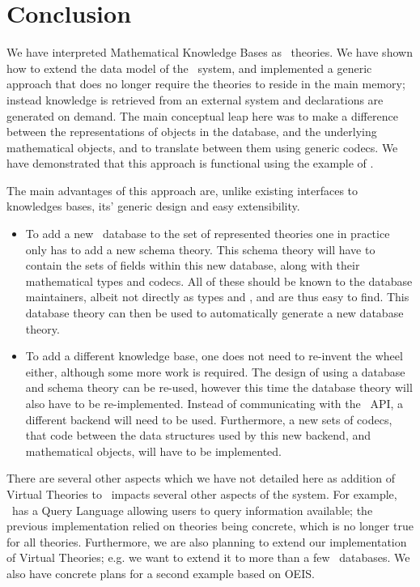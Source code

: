 \section{Conclusion}\label{sec:concl}

We have interpreted Mathematical Knowledge Bases as \omdocmmt\ theories. 
We have shown how to extend the data model of the \mmt\ system, and implemented a generic approach that does no longer require the theories to reside in the main memory; instead knowledge is retrieved from an external system and declarations are generated on demand.
The main conceptual leap here was to make a difference between the representations of objects in the database, and the underlying mathematical objects, and to translate between them using generic codecs. 
We have demonstrated that this approach is functional using the example of \lmfdb. 

The main advantages of this approach are, unlike existing interfaces to knowledges bases, its' generic design and easy extensibility. 
\begin{itemize}
  \item
    To add a new \lmfdb\ database to the set of represented theories one in practice only has to add a new schema theory. 
    This schema theory will have to contain the sets of fields within this new database, along with their mathematical types and codecs. 
    All of these should be known to the database maintainers, albeit not directly as types and , and are thus easy to find. 
    This database theory can then be used to automatically generate a new database theory. 
  \item
    To add a different knowledge base, one does not need to re-invent the wheel either, although some more work is required. 
    The design of using a database and schema theory can be re-used, however this time the database theory will also have to be re-implemented. 
    Instead of communicating with the \lmfdb\ API, a different backend will need to be used. 
    Furthermore, a new sets of codecs, that code between the data structures used by this new backend, and mathematical objects, will have to be implemented. 
\end{itemize}

There are several other aspects which we have not detailed here as addition of Virtual Theories to \mmt\ impacts several other aspects of the system. 
For example, \mmt\ has a Query Language allowing users to query information available; the previous implementation relied on theories being concrete, which is no longer true for all theories.  
Furthermore, we are also planning to extend our implementation of Virtual Theories; e.g. we want to extend it to more than a few \lmfdb\ databases. 
We also have concrete plans for a second example based on OEIS. 

